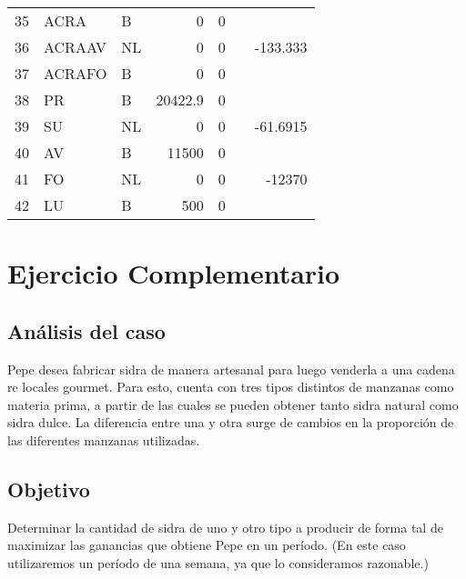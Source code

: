 \documentclass[a4paper,10pt]{article}
\begin{document}
\begin{center}
\begin{tabular}{| l  l  l  r  r  c  r |}
     35 &   ACRA &           B &                0 &               0 &                &		\\                
     36 &   ACRAAV &         NL &               0 &               0 &                &      -133.333 \\ 
     37 &   ACRAFO &         B &                0 &               0 &                &		\\ \hline               
     38 &   PR &             B &          20422.9 &               0 &                &		\\                
     39 &   SU &             NL &               0 &               0 &                &      -61.6915 \\ 
     40 &   AV &             B &            11500 &               0 &                &		\\                
     41 &   FO &             NL &               0 &               0 &                &        -12370 \\ 
     42 &   LU &             B &              500 &               0 &                &		\\                
\hline
       \end{tabular}
\end{center}

\newpage


\newpage

\section{Ejercicio Complementario}

\subsection{An\'alisis del caso}

Pepe desea fabricar sidra de manera artesanal para luego venderla a una cadena re locales gourmet. Para esto, cuenta con tres tipos distintos de manzanas como materia prima, a partir de las cuales se pueden obtener tanto sidra natural como sidra dulce. La diferencia entre una y otra surge de cambios en la proporci\'on de las diferentes manzanas utilizadas. 

\subsection{Objetivo}

Determinar la cantidad de sidra de uno y otro tipo a producir de forma tal de maximizar las ganancias que obtiene Pepe en un per\'iodo. (En este caso utilizaremos un per\'iodo de una semana, ya que lo consideramos razonable.)
\end{document}
